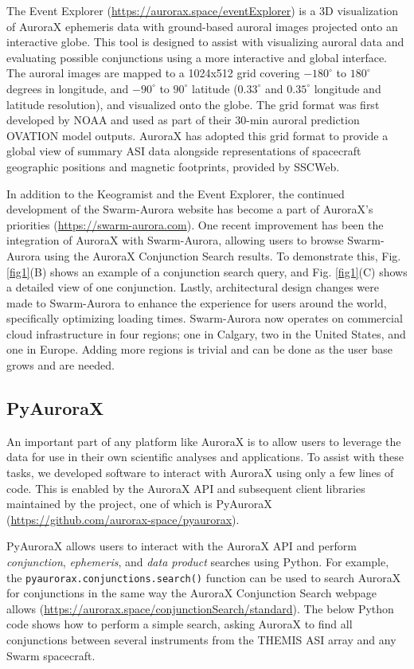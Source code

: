 \documentclass[utf8]{FrontiersinHarvard} %
\begin{document}
The Event Explorer (\url{https://aurorax.space/eventExplorer}) is a 3D visualization of AuroraX ephemeris data with ground-based auroral images projected onto an interactive globe. This tool is designed to assist with visualizing auroral data and evaluating possible conjunctions using a more interactive and global interface. The auroral images are mapped to a 1024x512 grid covering $-180^\circ$ to $180^\circ$ degrees in longitude, and $-90^\circ$ to $90^\circ$ latitude ($0.33^\circ$ and $0.35^\circ$ longitude and latitude resolution), and visualized onto the globe. The grid format was first developed by NOAA and used as part of their 30-min auroral prediction OVATION model outputs. AuroraX has adopted this grid format to provide a global view of summary ASI data alongside representations of spacecraft geographic positions and magnetic footprints, provided by SSCWeb.

In addition to the Keogramist and the Event Explorer, the continued development of the Swarm-Aurora website has become a part of AuroraX’s priorities (\url{https://swarm-aurora.com}). One recent improvement has been the integration of AuroraX with Swarm-Aurora, allowing users to browse Swarm-Aurora using the AuroraX Conjunction Search results. To demonstrate this, Fig. \ref{fig1}(B) shows an example of a conjunction search query, and Fig. \ref{fig1}(C) shows a detailed view of one conjunction. Lastly, architectural design changes were made to Swarm-Aurora to enhance the experience for users around the world, specifically optimizing loading times. Swarm-Aurora now operates on commercial cloud infrastructure in four regions; one in Calgary, two in the United States, and one in Europe. Adding more regions is trivial and can be done as the user base grows and are needed.

\subsection{PyAuroraX}
An important part of any platform like AuroraX is to allow users to leverage the data for use in their own scientific analyses and applications. To assist with these tasks, we developed software to interact with AuroraX using only a few lines of code. This is enabled by the AuroraX API and subsequent client libraries maintained by the project, one of which is PyAuroraX (\url{https://github.com/aurorax-space/pyaurorax}).

PyAuroraX allows users to interact with the AuroraX API and perform \textit{conjunction}, \textit{ephemeris}, and \textit{data product} searches using Python. For example, the \verb|pyaurorax.conjunctions.search()| function can be used to search AuroraX for conjunctions in the same way the AuroraX Conjunction Search webpage allows (\url{https://aurorax.space/conjunctionSearch/standard}). The below Python code shows how to perform a simple search, asking AuroraX to find all conjunctions between several instruments from the THEMIS ASI array and any Swarm spacecraft.
\end{document}
